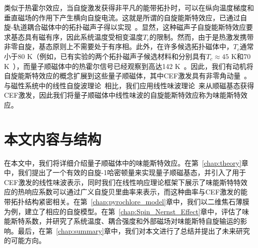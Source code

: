     类似于热霍尔效应，当自旋激发获得非平凡的能带拓扑时，可以在纵向温度梯度和垂直磁场的作用下产生横向自旋电流。这就是所谓的自旋能斯特效应，已通过自旋-轨道耦合磁体中的拓扑磁声子得以实现~\cite{cheng2016spin, zyuzin2016Magnon, meyer2017Observationb, shiomi2017Experimental, sheng2017Spin, ma2021Intrinsic, zhang2022Perspective}。显然，这种磁声子自旋能斯特效应要求基态具有磁有序，因此系统温度受相变温度$T_c$的限制。然而，由于是热激发携带非零自旋，基态原则上不需要处于有序相。此外，在许多候选拓扑磁体中，$T_c$通常小于80 K（例如，已有实验的两个拓扑磁声子候选材料和分别具有$T_c\approx 45$ K和$70$ K~\cite{huang2017Layerdependent, onose2010Observation}），而量子顺磁体中的热霍尔信号已经观察到高达142 K~\cite{hirschberger2015Thermal}。因此，我们有动机将自旋能斯特效应的概念扩展到这些量子顺磁体，其中CEF激发具有非零角动量~\cite{babkevich2015Neutrona, thalmeier2024Induced}。与磁性系统中的线性自旋波理论~\cite{kittel2018introduction}相比，我们应用线性味波理论~\cite{joshi1999elementary, li19984}来从顺磁基态获得CEF激发，因此我们将量子顺磁体中线性味波的自旋能斯特效应称为味能斯特效应。
    
    \section{本文内容与结构}
    在本文中，我们将详细介绍量子顺磁体中的味能斯特效应。在第~\ref{chap:theory}章中，我们提出了一个有效的自旋-1哈密顿量来实现量子顺磁基态，并引入了用于CEF激发的线性味波表示，同时我们在线性响应理论框架下展示了味能斯特特效应的热响应系数可以通过广义自旋贝里曲率来表示，而这种曲率与CEF激发的能带拓扑结构紧密相关。在第~\ref{chap:pyrochlore_model}章中，我们以二维焦石薄膜为例，建立了相应的自旋模型。在第~\ref{chap:Spin_Nernst_Effect}章中，评估了味能斯特系数，并研究了系统温度、耦合强度和外部磁场对味能斯特自旋输运的影响。最后，在第~\ref{chap:summary}章中，我们对本文进行了总结并提出了未来研究的可能方向。


